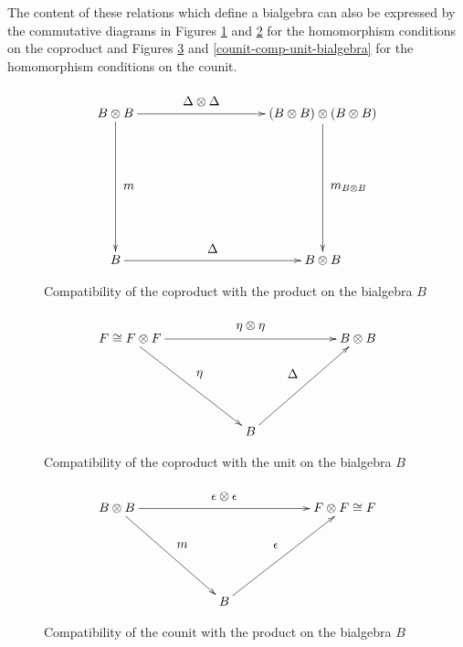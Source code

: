 The content of these relations which define a bialgebra
can also be expressed by the commutative diagrams in Figures
\ref{coproduct-comp-product-bialgebra} and \ref{coproduct-comp-unit-bialgebra} for the homomorphism
conditions on the coproduct and Figures \ref{counit-comp-product-bialgebra} and
\ref{counit-comp-unit-bialgebra} for the homomorphism
conditions on the counit.
\begin{figure}[!h]
  \[
  \xymatrix@=100pt{
    B \otimes B \ar[r]^-*+{\Delta \otimes \Delta} \ar[d]^-*+{m}& (B \otimes B) \otimes (B \otimes B) \ar[d]^-*+{m_{B \otimes B}}\\
    B \ar[r]^-*+{\Delta} & B \otimes B\\
  }
  \]
  \caption{Compatibility of the coproduct with the product on the bialgebra $B$}
  \label{coproduct-comp-product-bialgebra}
\end{figure}


\begin{figure}[!h]
  \[
  \xymatrix@=60pt{
    F \cong F \otimes F \ar[dr]^-*+{\eta} \ar[rr]^-*+{\eta \otimes \eta} &                       & B \otimes B\\
                                                                         & B \ar[ur]^-*+{\Delta} &            \\
  }
  \]
  \caption{Compatibility of the coproduct with the unit on the bialgebra $B$}
  \label{coproduct-comp-unit-bialgebra}
\end{figure}


\begin{figure}[!h]
  \[
  \xymatrix@=60pt{
    B \otimes B \ar[dr]^-*+{m} \ar[rr]^-*+{\epsilon \otimes \epsilon} &                         & F \otimes F \cong F \\
                                                                      & B \ar[ur]^-*+{\epsilon} &                     \\
  }
  \]
  \caption{Compatibility of the counit with the product on the bialgebra $B$}
  \label{counit-comp-product-bialgebra}
\end{figure}



